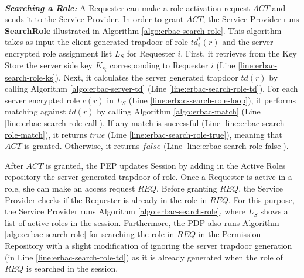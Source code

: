 \documentclass[epsfig,a4paper,11pt,titlepage]{book}
\numberwithin{algorithm}{chapter}
\begin{document}
\noindent \\
\noindent \emph{\textbf{Searching a Role:}} 
A Requester can make a role activation request $\mathit{ACT}$ and sends it to the Service Provider. In order to grant $\mathit{ACT}$, the Service Provider runs \textbf{SearchRole} illustrated in Algorithm \ref{algo:erbac-search-role}. This algorithm takes as input the client generated trapdoor of role $td^*_i (r)$ and the server encrypted role assignment list $L_{S}$ for Requester $i$. First, it retrieves from the Key Store the server side key $K_{s_i}$ corresponding to Requester $i$ (Line \ref{line:erbac-search-role-ks}). Next, it calculates the server generated trapdoor $td(r)$ by calling Algorithm \ref{algo:erbac-server-td} (Line \ref{line:erbac-search-role-td}). For each server encrypted role $c(r)$ in $L_{S}$ (Line \ref{line:erbac-search-role-loop}), it performs matching against $td(r)$ by calling Algorithm \ref{algo:erbac-match} (Line \ref{line:erbac-search-role-call}). If any match is successful (Line \ref{line:erbac-search-role-match}), it returns $\mathit{true}$ (Line \ref{line:erbac-search-role-true}), meaning that $\mathit{ACT}$ is granted. Otherwise, it returns $\mathit{false}$ (Line \ref{line:erbac-search-role-false}).

After $\mathit{ACT}$ is granted, the \gls{PEP} updates Session by adding in the Active Roles repository the server generated trapdoor of role. Once a Requester is active in a role, she can make an access request $\mathit{REQ}$. Before granting $\mathit{REQ}$, the Service Provider checks if the Requester is already in the role in $\mathit{REQ}$. For this purpose, the Service Provider runs Algorithm \ref{algo:erbac-search-role}, where $L_{S}$ shows a list of active roles in the session. Furthermore, the \gls{PDP} also runs Algorithm \ref{algo:erbac-search-role} for searching the role in $\mathit{REQ}$ in the Permission Repository with a slight modification of ignoring the server trapdoor generation (in Line \ref{line:erbac-search-role-td}) as it is already generated when the role of $\mathit{REQ}$ is searched in the session.
\end{document}
